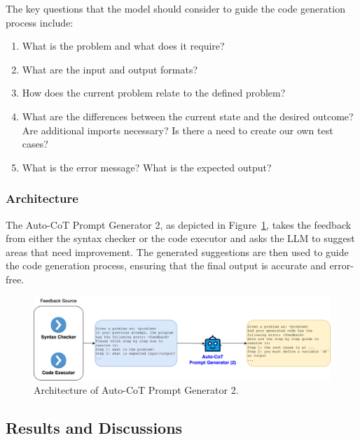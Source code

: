 \documentclass[a4paper,oneside]{book}
\begin{document}
The key questions that the model should consider to guide the code generation process include:
\begin{enumerate}
    \item What is the problem and what does it require?

    \item What are the input and output formats?

    \item How does the current problem relate to the defined problem?

    \item What are the differences between the current state and the desired outcome? Are additional imports necessary? Is there a need to create our own test cases?

    \item What is the error message? What is the expected output?
\end{enumerate}

\subsubsection{Architecture}
The Auto-CoT Prompt Generator 2, as depicted in Figure~\ref{fig:cot_generator_2}, takes the feedback from either the syntax checker or the code executor and asks the LLM to suggest areas that need improvement. The generated suggestions are then used to guide the code generation process, ensuring that the final output is accurate and error-free.

\begin{figure}[H]
    \centering
    \includegraphics[width=1.0\textwidth]{img/cot_generator_2}
    \caption{Architecture of Auto-CoT Prompt Generator 2.}\label{fig:cot_generator_2}
\end{figure}

\subsection{Results and Discussions}
\end{document}
